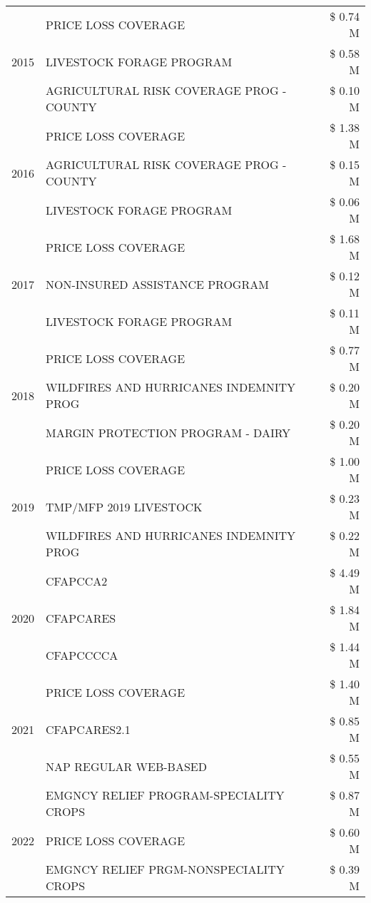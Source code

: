 \begin{tabular}{llr}
\cline{1-3}
\multirow[t]{3}{*}{2015} & PRICE LOSS COVERAGE & \$ 0.74 M \\
 & LIVESTOCK FORAGE PROGRAM & \$ 0.58 M \\
 & AGRICULTURAL RISK COVERAGE PROG - COUNTY & \$ 0.10 M \\
\cline{1-3}
\multirow[t]{3}{*}{2016} & PRICE LOSS COVERAGE & \$ 1.38 M \\
 & AGRICULTURAL RISK COVERAGE PROG - COUNTY & \$ 0.15 M \\
 & LIVESTOCK FORAGE PROGRAM & \$ 0.06 M \\
\cline{1-3}
\multirow[t]{3}{*}{2017} & PRICE LOSS COVERAGE & \$ 1.68 M \\
 & NON-INSURED ASSISTANCE PROGRAM & \$ 0.12 M \\
 & LIVESTOCK FORAGE PROGRAM & \$ 0.11 M \\
\cline{1-3}
\multirow[t]{3}{*}{2018} & PRICE LOSS COVERAGE & \$ 0.77 M \\
 & WILDFIRES AND HURRICANES INDEMNITY PROG & \$ 0.20 M \\
 & MARGIN PROTECTION PROGRAM - DAIRY & \$ 0.20 M \\
\cline{1-3}
\multirow[t]{3}{*}{2019} & PRICE LOSS COVERAGE & \$ 1.00 M \\
 & TMP/MFP 2019 LIVESTOCK & \$ 0.23 M \\
 & WILDFIRES AND HURRICANES INDEMNITY PROG & \$ 0.22 M \\
\cline{1-3}
\multirow[t]{3}{*}{2020} & CFAPCCA2 & \$ 4.49 M \\
 & CFAPCARES & \$ 1.84 M \\
 & CFAPCCCCA & \$ 1.44 M \\
\cline{1-3}
\multirow[t]{3}{*}{2021} & PRICE LOSS COVERAGE & \$ 1.40 M \\
 & CFAPCARES2.1 & \$ 0.85 M \\
 & NAP REGULAR WEB-BASED & \$ 0.55 M \\
\cline{1-3}
\multirow[t]{3}{*}{2022} & EMGNCY RELIEF PROGRAM-SPECIALITY CROPS & \$ 0.87 M \\
 & PRICE LOSS COVERAGE & \$ 0.60 M \\
 & EMGNCY RELIEF PRGM-NONSPECIALITY CROPS & \$ 0.39 M \\
\cline{1-3}
\bottomrule
\end{tabular}
